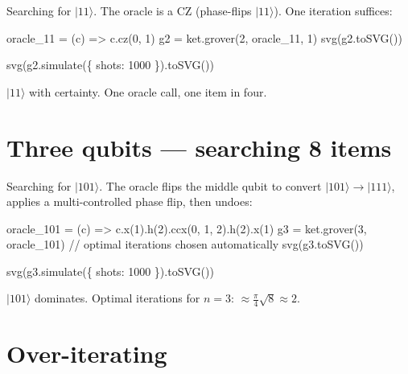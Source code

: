 \documentclass[
  11pt,
  letterpaper,
  oneside]{scrbook}
\newenvironment{Shaded}{\begin{snugshade}}{\end{snugshade}}
\newcommand{\NormalTok}[1]{\textcolor[rgb]{0.00,0.23,0.31}{#1}}
\begin{document}
Searching for \(|11\rangle\). The oracle is a CZ (phase-flips
\(|11\rangle\)). One iteration suffices:

\begin{Shaded}
\begin{Highlighting}[]
\NormalTok{oracle\_11 = (c) =\textgreater{} c.cz(0, 1)}
\NormalTok{g2 = ket.grover(2, oracle\_11, 1)}
\NormalTok{svg(g2.toSVG())}
\end{Highlighting}
\end{Shaded}

\begin{Shaded}
\begin{Highlighting}[]
\NormalTok{svg(g2.simulate(\{ shots: 1000 \}).toSVG())}
\end{Highlighting}
\end{Shaded}

\(|11\rangle\) with certainty. One oracle call, one item in four.

\section{Three qubits --- searching 8
items}\label{three-qubits-searching-8-items}

Searching for \(|101\rangle\). The oracle flips the middle qubit to
convert \(|101\rangle \to |111\rangle\), applies a multi-controlled
phase flip, then undoes:

\begin{Shaded}
\begin{Highlighting}[]
\NormalTok{oracle\_101 = (c) =\textgreater{} c.x(1).h(2).ccx(0, 1, 2).h(2).x(1)}
\NormalTok{g3 = ket.grover(3, oracle\_101)   // optimal iterations chosen automatically}
\NormalTok{svg(g3.toSVG())}
\end{Highlighting}
\end{Shaded}

\begin{Shaded}
\begin{Highlighting}[]
\NormalTok{svg(g3.simulate(\{ shots: 1000 \}).toSVG())}
\end{Highlighting}
\end{Shaded}

\(|101\rangle\) dominates. Optimal iterations for \(n=3\):
\(\approx\frac{\pi}{4}\sqrt{8} \approx 2\).

\section{Over-iterating}\label{over-iterating}
\end{document}
